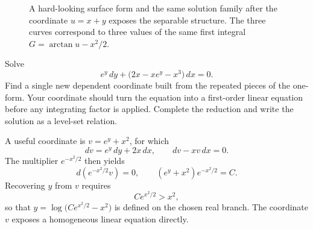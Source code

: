 \documentclass[11pt]{article}
\theoremstyle{definition}
\begin{document}
\begin{figure}[ht]
\centering
\begin{minipage}{0.47\textwidth}
\centering
{}
\end{minipage}
\hfill
\begin{minipage}{0.47\textwidth}
\centering
{}
\end{minipage}
\caption{A hard-looking surface form and the same solution family after the coordinate $u=x+y$ exposes the separable structure. The three curves correspond to three values of the same first integral $G=\arctan u-x^2/2$.}
\label{fig:app-diagonal}
\end{figure}

\begin{challengebox}[title={Challenge A.6: a hidden composite coordinate}]
Solve
\[
e^y\,dy+\bigl(2x-xe^y-x^3\bigr)\,dx=0.
\]
Find a single new dependent coordinate built from the repeated pieces of the one-form. Your coordinate should turn the equation into a first-order linear equation before any integrating factor is applied. Complete the reduction and write the solution as a level-set relation.
\end{challengebox}

A useful coordinate is $v=e^y+x^2$, for which
\[
dv=e^y\,dy+2x\,dx,
\qquad
dv-xv\,dx=0.
\]
The multiplier $e^{-x^2/2}$ then yields
\[
d\left(e^{-x^2/2}v\right)=0,
\qquad
\boxed{(e^y+x^2)e^{-x^2/2}=C.}
\]
Recovering \(y\) from \(v\) requires
\[
Ce^{x^2/2}>x^2,
\]
so that \(y=\log\bigl(Ce^{x^2/2}-x^2\bigr)\) is defined on the chosen real branch. The coordinate \(v\) exposes a homogeneous linear equation directly.
\end{document}
